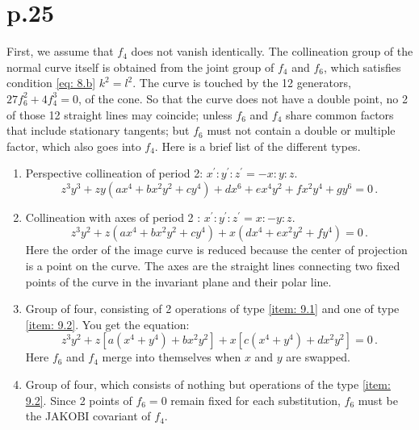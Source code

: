 \documentclass[leqno]{article}
\begin{document}
\section{p.25}
First, we assume that $f_4$ does not vanish identically. The collineation group of the normal curve itself is obtained from the joint group of $f_4$ and $f_6$, which satisfies condition \eqref{eq: 8.b} $k^2=l^2$. The curve is touched by the 12 generators, $27 f_6^2 + 4 f_4^3=0$, of the cone. So that the curve does not have a double point, no 2 of those 12 straight lines may coincide; unless $f_6$ and $f_4$ share common factors that include stationary tangents; but $f_6$ must not contain a double or multiple factor, which also goes into $f_4$. Here is a brief list of the different types. 
\begin{enumerate}[label=\arabic*)]
    \item \label{item: 9.1}Perspective collineation of period 2: $x^\prime : y^\prime : z^\prime = -x : y : z$.
    \begin{equation}\label{eq: 9.1}
        z^3 y^3 + zy (ax^4 + b x^2 y^2 + c y^4) + dx^6 + e x^4 y^2 + f x^2 y^4 + g y^6 = 0 \, . \tag{1}
    \end{equation}
    \item \label{item: 9.2}Collineation \guillemotright with axes \guillemotright of period 2 : $x^\prime : y^\prime : z^\prime = x : -y : z$.
    \begin{equation}\label{eq: 9.2}
        z^3 y^2 + z(ax^4 + b x^2 y^2 + c y^4) + x(dx^4 + e x^2 y^2 + f y^4) = 0 \, . \tag{2}
    \end{equation}
    Here the order of the image curve is reduced because the center of projection is a point on the curve. The axes are the straight lines connecting two fixed points of the curve in the invariant plane and their polar line.
    \item \label{item: 9.3}Group of four, consisting of 2 operations of type \ref{item: 9.1} and one of type \ref{item: 9.2}. You get the equation: 
    \begin{equation}\label{eq: 9.3}
        z^3 y^2 + z[a(x^4 + y^4) + b x^2 y^2] + x[c(x^4 + y^4) + d x^2 y^2] = 0 \, . \tag{3}
    \end{equation}
    Here $f_6$ and $f_4$ merge into themselves when $x$ and $y$ are swapped.
    \item \label{item: 9.4}Group of four, which consists of nothing but operations of the type \ref{item: 9.2}. Since 2 points of $f_6=0$ remain fixed for each substitution, $f_6$ must be the JAKOBI covariant of $f_4$.

\end{enumerate}
\end{document}
